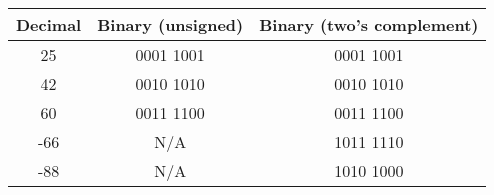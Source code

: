 \begin{blocksection}
\begin{solution}[2in]
\begin{center}
  \begin{tabular}{|c|c|c|}
    \hline
    Decimal & Binary (unsigned) & Binary (two's complement) \\
    \hline\hline
    25 & 0001 1001 & 0001 1001 \\
    \hline
    42 & 0010 1010 & 0010 1010 \\
    \hline
    60 & 0011 1100 & 0011 1100 \\
    \hline
    -66 & N/A & 1011 1110 \\
    \hline
    -88 & N/A & 1010 1000 \\
    \hline
  \end{tabular}
\end{center}
\end{solution}
\end{blocksection}

